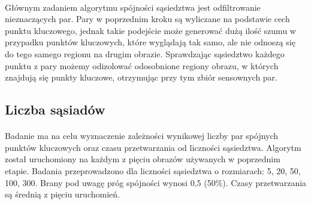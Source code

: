 \documentclass[../main.tex]{subfiles}
\begin{document}
    \paragraph{}
   Głównym zadaniem algorytmu spójności sąsiedztwa jest odfiltrowanie nieznaczących par. Pary w poprzednim kroku są wyliczane na podstawie cech punktu kluczowego, jednak takie podejście może generować dużą ilość szumu w przypadku punktów kluczowych, które wyglądają tak samo, ale nie odnoszą się do tego samego regionu na drugim obrazie. Sprawdzając sąsiedztwo każdego punktu z pary możemy odizolować odosobnione regiony obrazu, w których znajdują się punkty kluczowe, otrzymując przy tym zbiór sensownych par.
   
    \subsection{Liczba sąsiadów}
    \paragraph{}
    Badanie ma na celu wyznaczenie zależności wynikowej liczby par spójnych punktów kluczowych oraz czasu przetwarzania od liczności sąsiedztwa. Algorytm został uruchomiony na każdym z pięciu obrazów używanych w poprzednim etapie. Badania przeprowadzono dla liczności sąsiedztwa o rozmiarach: 5, 20, 50, 100, 300. Brany pod uwagę próg spójności wynosi 0,5 (50\%). Czasy przetwarzania są średnią z pięciu uruchomień.
    
\end{document}
